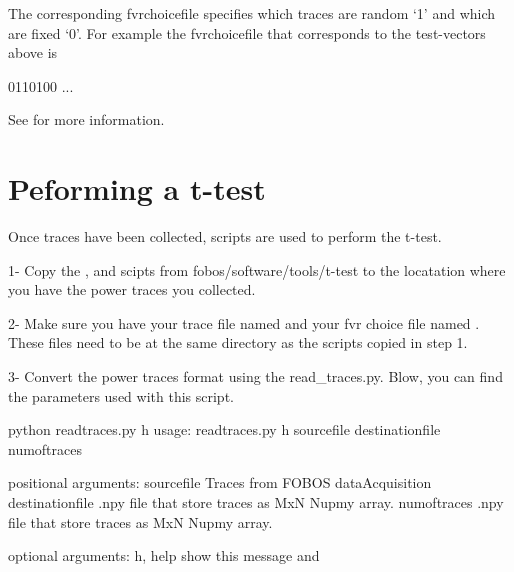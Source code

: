 \documentclass[letterpaper,10pt,english]{sphinxmanual}
\begin{document}
The corresponding fvrchoicefile specifies which traces are random ‘1’ and which are fixed ‘0’.
For example the fvrchoicefile that corresponds to the test-vectors above is

\begin{sphinxVerbatim}[commandchars=\\\{\}]
0110100 ...
\end{sphinxVerbatim}

See {\hyperref[\detokenize{tvgen:tvgen-label}]{}} for more information.


\section{Peforming a t-test}
\label{\detokenize{t_test:peforming-a-t-test}}
Once traces have been collected, scripts are used to perform the t-test.

1- Copy the ,  and   scipts from fobos/software/tools/t-test to the locatation where you have the power
traces you collected.

2- Make sure you have your trace file named  and your fvr choice file named .
These files need to be at the same directory as the scripts copied in step 1.

3- Convert the power traces format using the read\_traces.py. Blow, you can find the parameters used with this script.

\begin{sphinxVerbatim}[commandchars=\\\{\}]
\PYGZdl{} python read\PYGZus{}traces.py \PYGZhy{}h
usage: read\PYGZus{}traces.py \PYG{o}{[}\PYGZhy{}h\PYG{o}{]} source\PYGZus{}file destination\PYGZus{}file num\PYGZus{}of\PYGZus{}traces

positional arguments:
source\PYGZus{}file       Traces from FOBOS dataAcquisition
destination\PYGZus{}file  .npy file that store traces as MxN Nupmy array.
num\PYGZus{}of\PYGZus{}traces     .npy file that store traces as MxN Nupmy array.

optional arguments:
\PYGZhy{}h, \PYGZhy{}\PYGZhy{}help        show this  message and 
\end{sphinxVerbatim}
\end{document}
